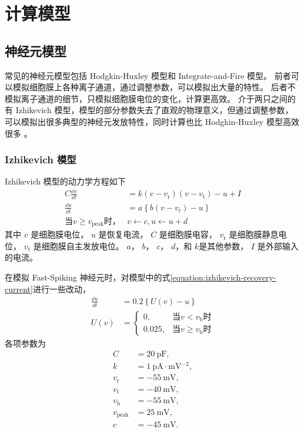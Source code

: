 \chapter{计算模型}
\label{chapter:model}

\section{神经元模型}
\label{section:model:neuron-model}

常见的神经元模型包括 Hodgkin-Huxley 模型和 Integrate-and-Fire 模型。
前者可以模拟细胞膜上各种离子通道，通过调整参数，可以模拟出大量的特性。
后者不模拟离子通道的细节，只模拟细胞膜电位的变化，计算更高效。
介于两只之间的有 Izhikevich 模型，模型的部分参数失去了直观的物理意义，但通过调整参数，可以模拟出很多典型的神经元发放特性，同时计算也比 Hodgkin-Huxley 模型高效很多 \cite{Izhikevich2003,Izhikevich2004}。

\subsection{Izhikevich 模型}
Izhikevich 模型的动力学方程如下
\begin{align}
C \frac{\dd{v}}{\dd{t}} &= k \left( v-v_\text{r} \right) \left( v-v_\text{t} \right) - u + I \label{equation:izhikevich-membrane} \\
\frac{\dd{u}}{\dd{t}} &= a \left\{ b \left( v-v_\text{r} \right) - u \right\} \label{equation:izhikevich-recovery-current} \\
\text{当} v \geq v_{\text{peak}} \text{时，} & v \leftarrow c, u \leftarrow u + d \label{equation:izhikevich-spike}
\end{align}
其中 $v$ 是细胞膜电位， $u$ 是恢复电流， $C$ 是细胞膜电容， $v_\text{r}$ 是细胞膜静息电位， $v_\text{t}$ 是细胞膜自主发放电位。
$a$， $b$， $c$， $d$，和 $k$是其他参数， $I$ 是外部输入的电流。

在模拟 Fast-Spiking 神经元时，对模型中的式\ref{equation:izhikevich-recovery-current}进行一些改动，
\begin{align}
\frac{\dd{u}}{\dd{t}} &= 0.2 \left\{ U\left( v \right) - u \right\} \label{equation:izhikevich-fast-spiking} \\
U\left( v \right) &= \begin{cases} 0, &\mbox{当} v < v_\text{b} \mbox{时} \\ 0.025, &\mbox{当} v \geq v_\text{b} \mbox{时} \end{cases}
\end{align}
各项参数为
\begin{align*}
C &= 20\ \text{pF}, \\
k &= 1\ \text{pA} \cdot \text{mV$^{-2}$}, \\
v_\text{r} &= -55\ \text{mV}, \\
v_\text{t} &= -40\ \text{mV}, \\
v_\text{b} &= -55\ \text{mV}, \\
v_\text{peak} &= 25\ \text{mV}, \\
c &= -45\ \text{mV}.
\end{align*}

